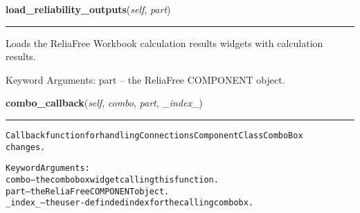     \vspace{0.5ex}

\hspace{.8\funcindent}\begin{boxedminipage}{\funcwidth}

    \raggedright \textbf{load\_reliability\_outputs}(\textit{self}, \textit{part})

    \vspace{-1.5ex}

    \rule{\textwidth}{0.5\fboxrule}
\setlength{\parskip}{2ex}
    Loads the ReliaFree Workbook calculation results widgets with 
    calculation results.

    Keyword Arguments: part -- the ReliaFree COMPONENT object.

\setlength{\parskip}{1ex}
    \end{boxedminipage}

    \label{reliafree:connections:connection:Connection:combo_callback}

    \vspace{0.5ex}

\hspace{.8\funcindent}\begin{boxedminipage}{\funcwidth}

    \raggedright \textbf{combo\_callback}(\textit{self}, \textit{combo}, \textit{part}, \textit{\_index\_})

    \vspace{-1.5ex}

    \rule{\textwidth}{0.5\fboxrule}
\setlength{\parskip}{2ex}
\begin{alltt}
Callback function for handling Connections Component Class ComboBox
changes.

Keyword Arguments:
  combo -- the combobox widget calling this function.
   part -- the ReliaFree COMPONENT object.
\_index\_ -- the user-definded index for the calling combobx.
\end{alltt}

\setlength{\parskip}{1ex}
    \end{boxedminipage}

    \label{reliafree:connections:connection:Connection:entry_callback}

